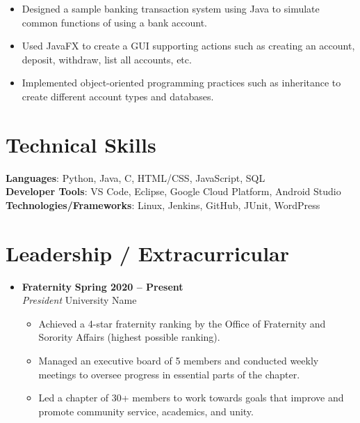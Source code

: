 \documentclass[letterpaper,5pt]{article}
\newcommand{\smalltextbullet}{\,\begin{picture}(-1,1)(-1,-3)\circle*{3}\end{picture}\ }
\begin{document}
\begin{itemize}[leftmargin=0in, label={}]
            \begin{itemize}
                \vspace*{-2mm}
                \item[\smalltextbullet] Designed a sample banking transaction system using Java to simulate common functions of using a bank account.
                \item[\smalltextbullet] Used JavaFX to create a GUI supporting actions such as creating an account, deposit, withdraw, list all accounts, etc.
                \item[\smalltextbullet] Implemented object-oriented programming practices such as inheritance to create different account types and databases.
            \end{itemize}
    \end{itemize}
    \vspace{-15pt}
    
    \section{\textbf{Technical Skills}}
    \begin{itemize}[leftmargin=0.15in, label={}]
        \small{\item{
            \textbf{Languages}{: Python, Java, C, HTML/CSS, JavaScript, SQL} \\
            \textbf{Developer Tools}{: VS Code, Eclipse, Google Cloud Platform, Android Studio} \\
            \textbf{Technologies/Frameworks}{: Linux, Jenkins, GitHub, JUnit, WordPress} \\
        }}
    \end{itemize}
    \vspace{-16pt}
    
    \section{\textbf{Leadership / Extracurricular}}
    \begin{itemize}
        \item[]
            \textbf{Fraternity} \hfill \textbf{Spring 2020 -- Present} \\
            \textit{President} \hfill University Name
            \begin{itemize}
                \vspace*{-2mm}
                \item[\smalltextbullet] Achieved a 4-star fraternity ranking by the Office of Fraternity and Sorority Affairs (highest possible ranking).
                \item[\smalltextbullet] Managed an executive board of 5 members and conducted weekly meetings to oversee progress in essential parts of the chapter.
                \item[\smalltextbullet] Led a chapter of 30+ members to work towards goals that improve and promote community service, academics, and unity.
            \end{itemize}
    \end{itemize}
    
\end{document}
